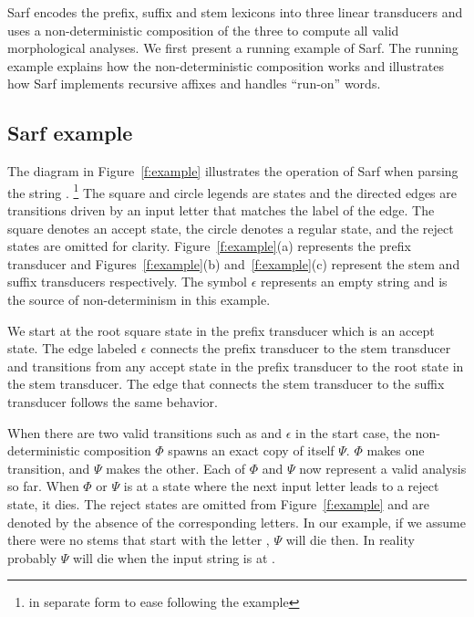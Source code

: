 \documentclass[11pt,letterpaper]{article}
\begin{document}
Sarf encodes the prefix, suffix and stem lexicons into 
three linear transducers and uses a non-deterministic composition
of the three to compute all valid morphological analyses.
We first present a running example of Sarf. 
The running example explains
how the non-deterministic composition works and 
illustrates how Sarf implements recursive affixes and
handles ``run-on'' words.

\subsection{Sarf example}
\label{sec:example}

\transfalse
\begin{figure*}[tb]
\end{figure*}
\transtrue

The diagram in Figure~\ref{f:example}
illustrates the operation of Sarf when parsing the
string .
\footnote{ 
%
in separate form to ease following the example
}
The square and circle legends are states 
and the directed edges are transitions driven by an input
letter that matches the label of the edge. 
The square denotes an accept state, 
the circle denotes a regular state, and the reject states
are omitted for clarity. 
Figure~\ref{f:example}(a) represents the prefix transducer and 
Figures~\ref{f:example}(b) and~\ref{f:example}(c) represent the 
stem and suffix transducers respectively. 
The symbol $\epsilon$ represents an empty string and is 
the source of non-determinism in this example. 

We start at the root square state in the prefix transducer
which is an accept state. 
The edge labeled $\epsilon$ connects the prefix 
transducer to the stem transducer and transitions from any accept state
in the prefix transducer to the root state in the stem transducer.
The edge that connects the stem transducer to the suffix transducer
follows the same behavior. 

When there are two valid transitions such as  
and $\epsilon$ in the start case, the non-deterministic 
composition $\Phi$ spawns an exact copy of itself $\Psi$. 
$\Phi$ makes one transition, and $\Psi$ makes the other. 
Each of $\Phi$ and $\Psi$ now represent a valid analysis so far. 
When $\Phi$ or $\Psi$ is at a state where the next input letter
leads to a reject state, it dies.
The reject states are omitted from Figure~\ref{f:example}
and are denoted by the absence of the corresponding 
letters. 
In our example, if we assume there were no stems that start 
with the letter , $\Psi$ will die then. 
In reality probably $\Psi$ will die when the input string
is at . 
\end{document}

